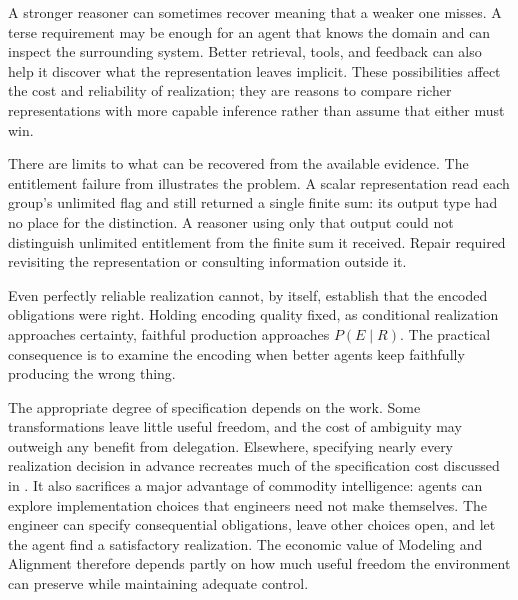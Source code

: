 
A stronger reasoner can sometimes recover meaning that a weaker one misses. A terse requirement may be enough for an agent that knows the domain and can inspect the surrounding system. Better retrieval, tools, and feedback can also help it discover what the representation leaves implicit. These possibilities affect the cost and reliability of realization; they are reasons to compare richer representations with more capable inference rather than assume that either must win.

There are limits to what can be recovered from the available evidence. The entitlement failure from  illustrates the problem. A scalar representation read each group's unlimited flag and still returned a single finite sum: its output type had no place for the distinction. A reasoner using only that output could not distinguish unlimited entitlement from the finite sum it received. Repair required revisiting the representation or consulting information outside it.


Even perfectly reliable realization cannot, by itself, establish that the encoded obligations were right. Holding encoding quality fixed, as conditional realization approaches certainty, faithful production approaches \(P(E\mid R)\). The practical consequence is to examine the encoding when better agents keep faithfully producing the wrong thing.


The appropriate degree of specification depends on the work. Some transformations leave little useful freedom, and the cost of ambiguity may outweigh any benefit from delegation. Elsewhere, specifying nearly every realization decision in advance recreates much of the specification cost discussed in . It also sacrifices a major advantage of commodity intelligence: agents can explore implementation choices that engineers need not make themselves. The engineer can specify consequential obligations, leave other choices open, and let the agent find a satisfactory realization. The economic value of Modeling and Alignment therefore depends partly on how much useful freedom the environment can preserve while maintaining adequate control.

